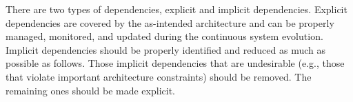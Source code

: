 \begin{itemize}
There are two types of dependencies, explicit and implicit dependencies. Explicit dependencies are covered by the as-intended architecture and can be  properly managed, monitored, and updated during the continuous system evolution. Implicit dependencies should be properly identified and reduced as much as possible as follows. Those implicit dependencies that are undesirable (e.g., those that violate important architecture constraints) should be removed. The remaining ones should be made explicit.   




\end{itemize}
